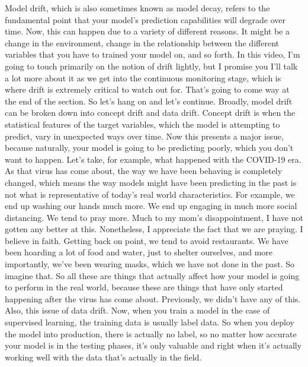 {{{{    Model drift, which is also sometimes known as model decay,
    refers to the fundamental point that your model's prediction capabilities
    will degrade over time.
    Now, this can happen due to a variety of different reasons.
    It might be a change in the environment, change
    in the relationship between the different variables
    that you have to trained your model on, and so forth.
    In this video, I'm going to touch primarily on the notion of drift
    lightly, but I promise you I'll talk a lot more about it
    as we get into the continuous monitoring stage, which is where drift
    is extremely critical to watch out for.
    That's going to come way at the end of the section.
    So let's hang on and let's continue.
    Broadly, model drift can be broken down into concept drift and data drift.
    Concept drift is when the statistical features of the target variables,
    which the model is attempting to predict,
    vary in unexpected ways over time.
    Now this presents a major issue, because naturally, your model
    is going to be predicting poorly, which you don't want to happen.
    Let's take, for example, what happened with the COVID-19 era.
    As that virus has come about, the way we have been behaving
    is completely changed, which means the way models might have been predicting
    in the past is not what is representative of today's real world
    characteristics.
    For example, we end up washing our hands much more.
    We end up engaging in much more social distancing.
    We tend to pray more.
    Much to my mom's disappointment, I have not gotten any better at this.
    Nonetheless, I appreciate the fact that we are praying.
    I believe in faith.
    Getting back on point, we tend to avoid restaurants.
    We have been hoarding a lot of food and water, just to shelter ourselves,
    and more importantly, we've been wearing masks,
    which we have not done in the past.
    So imagine that.
    So all these are things that actually affect
    how your model is going to perform in the real world,
    because these are things that have only started happening after the virus has
    come about.
    Previously, we didn't have any of this.
    Also, this issue of data drift.
    Now, when you train a model in the case of supervised learning,
    the training data is usually label data.
    So when you deploy the model into production, there is actually no label,
    so no matter how accurate your model is in the testing phases,
    it's only valuable and right when it's actually
    working well with the data that's actually in the field.
}}}}
